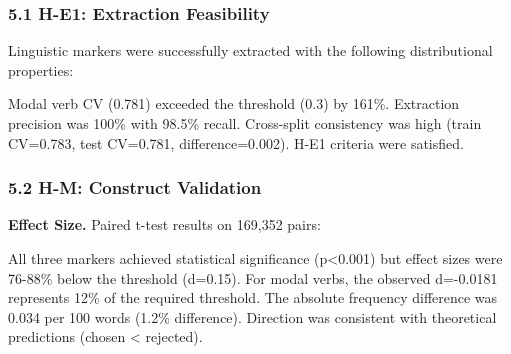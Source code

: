 
\subsubsection{5.1 H-E1: Extraction Feasibility}

Linguistic markers were successfully extracted with the following distributional properties:

\begin{table}[htbp]
\centering
{}
\end{table}

Modal verb CV (0.781) exceeded the threshold (0.3) by 161\%. Extraction precision was 100\% with 98.5\% recall. Cross-split consistency was high (train CV=0.783, test CV=0.781, difference=0.002). H-E1 criteria were satisfied.

\subsubsection{5.2 H-M: Construct Validation}

\textbf{Effect Size.} Paired t-test results on 169,352 pairs:

\begin{table}[htbp]
\centering
{}
\end{table}

All three markers achieved statistical significance (p<0.001) but effect sizes were 76-88\% below the threshold (d=0.15). For modal verbs, the observed d=-0.0181 represents 12\% of the required threshold. The absolute frequency difference was 0.034 per 100 words (1.2\% difference). Direction was consistent with theoretical predictions (chosen < rejected).

